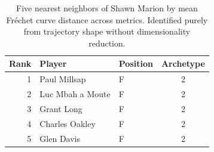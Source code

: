 \begin{table}[htbp]
  \centering\small
  \begin{tabular}{rllc}
    \toprule
    Rank & Player & Position & Archetype \\
    \midrule
    1 & Paul Millsap & F & 2 \\
    2 & Luc Mbah a Moute & F & 2 \\
    3 & Grant Long & F & 2 \\
    4 & Charles Oakley & F & 2 \\
    5 & Glen Davis & F & 2 \\
    \bottomrule
  \end{tabular}
  \caption{Five nearest neighbors of Shawn Marion by mean Fr\'{e}chet curve distance across metrics. Identified purely from trajectory shape without dimensionality reduction.}
  \label{tab:Shawn_Marion_frechet_curve_neighbors}
\end{table}

